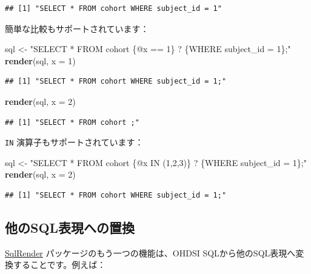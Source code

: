 \documentclass[
  11pt]{book}
\newenvironment{Shaded}{\begin{snugshade}}{\end{snugshade}}
\newcommand{\AttributeTok}[1]{\textcolor[rgb]{0.13,0.29,0.53}{#1}}
\newcommand{\DecValTok}[1]{\textcolor[rgb]{0.00,0.00,0.81}{#1}}
\newcommand{\FunctionTok}[1]{\textcolor[rgb]{0.13,0.29,0.53}{\textbf{#1}}}
\newcommand{\NormalTok}[1]{#1}
\newcommand{\OtherTok}[1]{\textcolor[rgb]{0.56,0.35,0.01}{#1}}
\newcommand{\StringTok}[1]{\textcolor[rgb]{0.31,0.60,0.02}{#1}}
\theoremstyle{definition}
\theoremstyle{definition}
\theoremstyle{definition}
\theoremstyle{definition}
\theoremstyle{remark}
\begin{document}
\begin{verbatim}
## [1] "SELECT * FROM cohort WHERE subject_id = 1"
\end{verbatim}

簡単な比較もサポートされています：

\begin{Shaded}
\begin{Highlighting}[]
\NormalTok{sql }\OtherTok{\textless{}{-}} \StringTok{"SELECT * FROM cohort \{@x == 1\} ? \{WHERE subject\_id = 1\};"}
\FunctionTok{render}\NormalTok{(sql, }\AttributeTok{x =} \DecValTok{1}\NormalTok{)}
\end{Highlighting}
\end{Shaded}

\begin{verbatim}
## [1] "SELECT * FROM cohort WHERE subject_id = 1;"
\end{verbatim}

\begin{Shaded}
\begin{Highlighting}[]
\FunctionTok{render}\NormalTok{(sql, }\AttributeTok{x =} \DecValTok{2}\NormalTok{)}
\end{Highlighting}
\end{Shaded}

\begin{verbatim}
## [1] "SELECT * FROM cohort ;"
\end{verbatim}

\texttt{IN} 演算子もサポートされています：

\begin{Shaded}
\begin{Highlighting}[]
\NormalTok{sql }\OtherTok{\textless{}{-}} \StringTok{"SELECT * FROM cohort \{@x IN (1,2,3)\} ? \{WHERE subject\_id = 1\};"}
\FunctionTok{render}\NormalTok{(sql, }\AttributeTok{x =} \DecValTok{2}\NormalTok{)}
\end{Highlighting}
\end{Shaded}

\begin{verbatim}
## [1] "SELECT * FROM cohort WHERE subject_id = 1;"
\end{verbatim}

\subsection{他のSQL表現への置換}\label{ux4ed6ux306esqlux8868ux73feux3078ux306eux7f6eux63db}

\href{https://ohdsi.github.io/SqlRender/}{SqlRender} パッケージのもう一つの機能は、OHDSI SQLから他のSQL表現へ変換することです。例えば：
\end{document}
